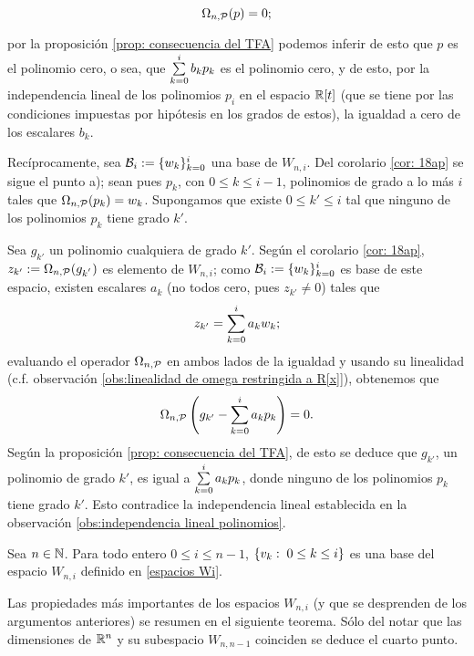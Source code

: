 \begin{equation} \label{eq2: 3Agosto}
\Omega_{n , \mathcal{P}} (p) = 0;
\end{equation}

\noindent
por la proposición \ref{prop: consecuencia del TFA}
podemos inferir de esto que $p$ es el polinomio cero,  
o sea, que
$\sum\limits_{k=0}^{i}b_{k}p_{k}$ es el polinomio cero,
y de esto, por la
independencia lineal de los polinomios $p_{i}$
en el espacio $\mathbb{R}[t]$ (que se tiene por las condiciones
impuestas por hipótesis en los grados de estos), la
igualdad a cero de los escalares $b_{k}$. 

Recíprocamente, sea $\mathcal{B}_{i} := \{ w_{k} \}_{k=0}^{i}$
una base de $W_{n,i}$. Del corolario 
\ref{cor: 18ap} se sigue el punto a);
sean pues $p_{k}$, con $0 \leq k \leq i-1$, 
polinomios de grado
a lo más $i$ tales que 
$\Omega_{n, \mathcal{P}}(p_{k})=w_{k}$.
Supongamos que existe $0 \leq k' \leq i$
tal que ninguno de los polinomios $p_{k}$
tiene grado $k'$.

Sea $g_{k'}$ un polinomio cualquiera de grado $k'$.
Según el corolario \ref{cor: 18ap}, 
$z_{k'}:= \Omega_{n, \mathcal{P}}(g_{k^{'}})$ es elemento
de $W_{n,i}$; como $\mathcal{B}_{i} := \{ w_{k} \}_{k=0}^{i}$
es base de este espacio, existen escalares
$a_{k}$ (no todos cero, pues
$z_{k'} \neq 0$) tales que 
\[
z_{k'} = \sum\limits_{k=0}^{i}a_{k} w_{k};
\]
evaluando el operador $\Omega_{n, \mathcal{P}}$ en ambos
lados de la igualdad y usando su linealidad
(c.f. observación \ref{obs:linealidad de omega restringida a R[x]}), 
obtenemos que 
\[
\Omega_{n, \mathcal{P}}
\left( g_{k'} - \sum\limits_{k=0}^{i}a_{k}p_{k}
\right) = 0.
\]
Según la proposición
\ref{prop: consecuencia del TFA}, de esto se deduce que 
$g_{k'}$, un polinomio de grado $k'$, es 
igual a $\sum\limits_{k=0}^{i}a_{k}p_{k}$, donde ninguno de los 
polinomios $p_{k}$ tiene grado $k'$.
Esto contradice la independencia lineal 
establecida en la observación 
\ref{obs:independencia lineal polinomios}.
\QEDB
\vspace{0.2cm}


\begin{cor}
Sea $n \in \mathbb{N}$. Para todo entero $0 \leq i \leq n-1$, 
$\{v_{k}: \hspace{0.1cm} 0\leq k \leq i \}$ es una base
del espacio $W_{n,i}$
definido en \eqref{espacios Wi}.
\end{cor}


Las propiedades más importantes de los
espacios $W_{n,i}$ (y que se desprenden
de los argumentos anteriores) se 
resumen en el siguiente teorema. 
Sólo del notar que las dimensiones de 
$\mathbb{R}^{n}$ y su subespacio $W_{n, n-1}$
coinciden se deduce el cuarto punto.


